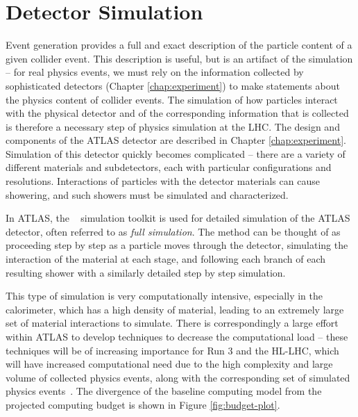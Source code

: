 \FloatBarrier
\section{Detector Simulation}
Event generation provides a full and exact description of the particle content of a given collider event. 
This description is useful, but is an artifact of the simulation -- for real physics events, we must rely on 
the information collected by sophisticated detectors (Chapter \ref{chap:experiment}) to make statements about the 
physics content of collider events. The simulation of how particles interact with the physical detector and of
the corresponding information that is collected is therefore a necessary step of physics simulation at the 
LHC. The design and components of the ATLAS detector are described in Chapter \ref{chap:experiment}. 
Simulation of this detector quickly becomes complicated -- there are a variety of different materials and subdetectors, each with particular configurations and resolutions. Interactions of particles with the detector materials can cause showering, and such showers must be simulated and characterized. 

In ATLAS, the \GEANT~\cite{GEANT4} simulation toolkit is used for detailed simulation of the ATLAS detector, often 
referred to as \emph{full simulation}. The method can be thought of as proceeding step by step as a particle moves 
through the detector, simulating the interaction of the material at each stage, and following each branch of each resulting 
shower with a similarly detailed step by step simulation. 

This type of simulation is very computationally intensive, especially in the calorimeter, which has a high density of 
material, leading to an extremely large set of material interactions to simulate. There is correspondingly a large 
effort within ATLAS to develop techniques to decrease the computational load -- these techniques will be of increasing 
importance for Run 3 and the HL-LHC, which will have increased computational need due to the high complexity and large 
volume of collected physics events, along with the corresponding set of simulated physics events~\cite{HLLHC-compute}. 
The divergence of the baseline computing model from the projected computing budget is shown in Figure \ref{fig:budget-plot}.

